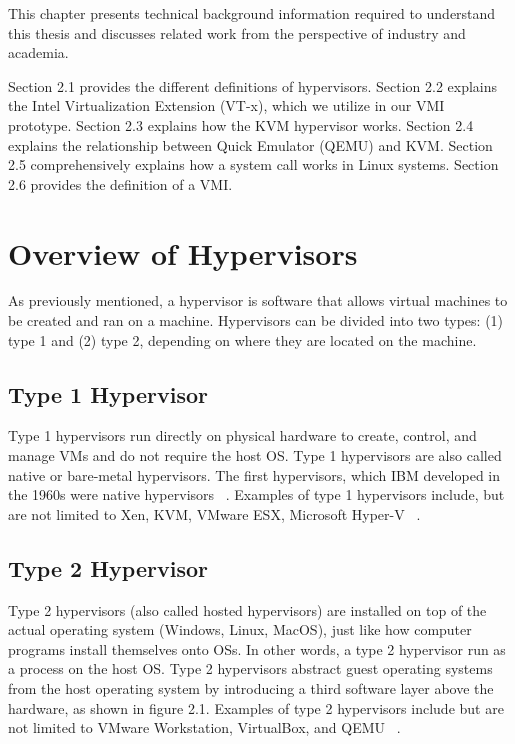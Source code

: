 \documentclass{report}
\begin{document}
\begin{spacing}{1.5}
{\large
This chapter presents technical background information required to understand this
thesis and discusses related work from the perspective of industry and academia. 
\newline
}

{\large
Section 2.1 provides the different definitions of hypervisors. 
Section 2.2 explains the Intel Virtualization Extension (VT-x), which we utilize in our VMI prototype. 
Section 2.3 explains how the KVM hypervisor works. 
Section 2.4 explains the relationship between Quick Emulator (QEMU) and KVM. 
Section 2.5 comprehensively explains how a system call works in Linux systems. 
Section 2.6 provides the definition of a VMI. 
\newline
}









\section{Overview of Hypervisors}

{\large
As previously mentioned, a hypervisor is software that allows virtual machines to be created and ran on a machine. Hypervisors can be divided into two types: (1) type 1 and (2) type 2, depending on where they are located on the machine.
\newline
}

\subsection{Type 1 Hypervisor}

{\large
Type 1 hypervisors run directly on physical hardware to create, control, and manage VMs and do not require the host OS. Type 1 hypervisors are also called native or bare-metal hypervisors. The first hypervisors, which IBM developed in the 1960s were native hypervisors ~\cite{meier2008ibm}. Examples of type 1 hypervisors include, but are not limited to Xen, KVM, VMware ESX, Microsoft Hyper-V ~\cite{bauman2015survey}.
\newline
}


\subsection{Type 2 Hypervisor}

{\large
Type 2 hypervisors (also called hosted hypervisors) are installed on top of the actual operating system (Windows, Linux, MacOS), just like how computer programs install themselves onto OSs. In other words, a type 2 hypervisor run as a process on the host OS. Type 2 hypervisors abstract guest operating systems from the host operating system by introducing a third software layer above the hardware, as shown in figure 2.1. Examples of type 2 hypervisors include but are not limited to VMware Workstation, VirtualBox, and QEMU ~\cite{bauman2015survey}.
\newline
}



\end{spacing}
\end{document}
